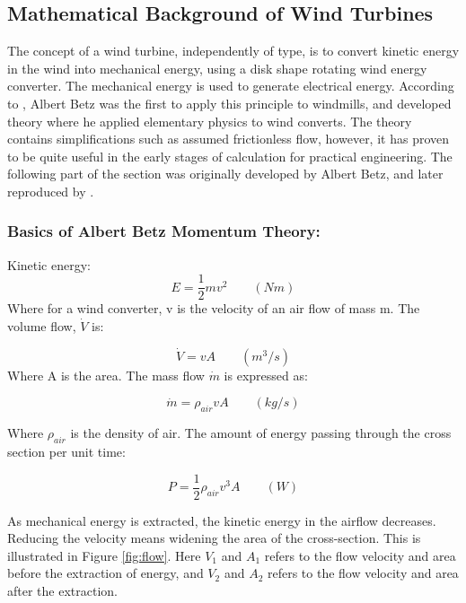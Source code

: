 \subsection{Mathematical Background of Wind Turbines}
The concept of a wind turbine, independently of type, is to convert kinetic energy in the wind into mechanical energy, using a disk shape rotating wind energy converter. The mechanical energy is used to generate electrical energy.  According to \cite{Hau2013},  Albert Betz was the first to apply this principle to windmills, and developed theory where he applied elementary physics to wind converts. The theory contains simplifications such as assumed frictionless flow, however, it has proven to be quite useful in the early stages of calculation for practical engineering. The following part of the section was originally developed by Albert Betz, and later reproduced by \cite{Hau2013}.

\subsubsection{Basics of Albert Betz Momentum Theory:}
\noindent Kinetic energy:
\begin{equation}
    E=\frac{1}{2} m v^2 \qquad (Nm)
\end{equation}
 Where for a wind converter, v is the velocity of an air flow of mass m. The volume flow, $\dot V$ is:
 
 \begin{equation}
    \dot V= v A \qquad (m^3/s)
\end{equation}
Where A is the area. The mass flow $\dot m$ is expressed as:

 \begin{equation}
    \dot m = \rho_{air} v A \qquad (kg/s)
\end{equation}

\noindent Where $\rho_{air}$ is the density of air. The amount of energy passing through the cross section per unit time:

 \begin{equation}
    P = \frac{1}{2}\rho_{air} v^3 A \qquad (W)
\end{equation}

\noindent As mechanical energy is extracted, the kinetic energy in the airflow decreases. Reducing the velocity means widening the area of the cross-section. This is illustrated in Figure \ref{fig:flow}. Here $V_1$ and  $A_1$ refers to the flow velocity and area before the extraction of energy, and $V_2$ and $A_2$ refers to the flow velocity and area after the extraction.


